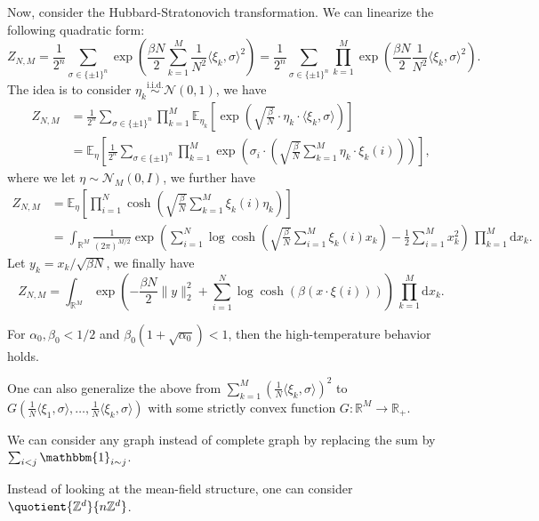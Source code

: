 Now, consider the Hubbard-Stratonovich transformation. We can linearize the following quadratic form:
\[
	Z_{N, M}
	= \frac{1}{2^n} \sum_{\sigma \in \{ \pm 1 \} ^n} \exp (\frac{\beta N}{2} \sum_{k=1}^{M} \frac{1}{N^2} \langle \xi _k, \sigma  \rangle ^2)
	= \frac{1}{2^n} \sum_{\sigma \in \{ \pm 1 \} ^n} \prod_{k=1}^{M} \exp (\frac{\beta N}{2} \frac{1}{N^2} \langle \xi _k, \sigma  \rangle ^2).
\]
The idea is to consider \(\eta _k \overset{\text{i.i.d.} }{\sim } \mathcal{N} (0, 1)\), we have
\[
	\begin{split}
		Z_{N, M}
		 & = \frac{1}{2^{n} } \sum_{\sigma \in \{ \pm 1 \} ^n} \prod_{k=1}^{M} \mathbb{E}_{\eta _k}\left[ \exp (\sqrt{\frac{\beta }{N}} \cdot \eta _k \cdot \langle \xi _k, \sigma  \rangle ) \right]                  \\
		 & = \mathbb{E}_{\eta }\left[ \frac{1}{2^{n} } \sum_{\sigma \in \{ \pm 1 \} ^n} \prod_{k=1}^{M} \exp (\sigma _i \cdot \left( \sqrt{\frac{\beta }{N}} \sum_{k=1}^{M} \eta _k \cdot \xi _k(i) \right) ) \right],
	\end{split}
\]
where we let \(\eta \sim \mathcal{N} _{M}(0, I)\), we further have
\[
	\begin{split}
		Z_{N, M}
		 & = \mathbb{E}_{\eta }\left[ \prod_{i=1}^{N} \cosh (\sqrt{\frac{\beta }{N}} \sum_{k=1}^{M} \xi _k(i) \eta _k) \right]                                                                                           \\
		 & = \int _{\mathbb{R} ^M} \frac{1}{(2\pi )^{M / 2}}\exp (\sum_{i=1}^{N} \log \cosh (\sqrt{\frac{\beta }{N}} \sum_{i=1}^{M} \xi _k(i) x_k) - \frac{1}{2} \sum_{i=1}^{M} x_k^2) \,\prod_{k=1}^{M} \mathrm{d} x_k.
	\end{split}
\]
Let \(y_k = x_k / \sqrt{\beta N} \), we finally have
\[
	Z_{N, M}
	= \int _{\mathbb{R} ^M} \exp (- \frac{\beta N}{2} \lVert y \rVert _2^2 + \sum_{i=1}^{N} \log \cosh (\beta (x \cdot \xi (i)))) \,\prod_{k=1}^{M} \mathrm{d} x_k.
\]

\begin{theorem}
	For \(\alpha _0, \beta _0 < 1 / 2\) and \(\beta _0(1 + \sqrt{\alpha _0} ) < 1\), then the high-temperature behavior holds.
\end{theorem}

\begin{remark}
	One can also generalize the above from \(\sum_{k=1}^{M} (\frac{1}{N} \langle \xi _k, \sigma \rangle )^2\) to \(G(\frac{1}{N} \langle \xi _1, \sigma \rangle , \dots , \frac{1}{N} \langle \xi _k, \sigma \rangle )\) with some strictly convex function \(G \colon \mathbb{R} ^M \to \mathbb{R} _+\).
\end{remark}

\begin{remark}
	We can consider any graph instead of complete graph by replacing the sum by \(\sum_{i <j} \mathbbm{1}_{i \sim j} \).
\end{remark}

\begin{remark}
	Instead of looking at the mean-field structure, one can consider \(\quotient{\mathbb{Z} ^d}{n \mathbb{Z} ^d} \).
\end{remark}
